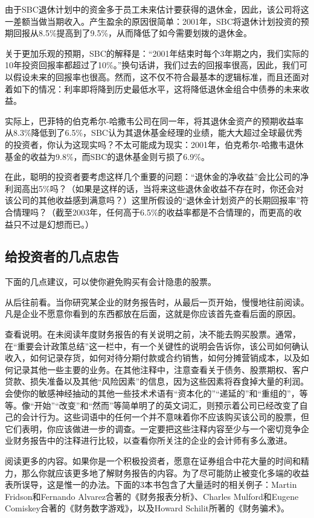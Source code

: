 \documentclass[12pt,oneside]{book}
\begin{document}
由于SBC退休计划中的资金多于员工未来估计要获得的退休金，因此，该公司将这一差额当做当期收入。产生盈余的原因很简单：2001年，SBC将退休计划投资的预期回报从8.5\%提高到了9.5\%，从而降低了如今需要划拨的退休金。

关于更加乐观的预期，SBC的解释是：“2001年结束时每个3年期之内，我们实际的10年投资回报率都超过了10\%。”换句话讲，我们过去的回报率很高，因此，我们可以假设未来的回报率也很高。然而，这不仅不符合最基本的逻辑标准，而且还面对着如下的情况：利率即将降到历史最低水平，这将降低退休金组合中债券的未来收益。

实际上，巴菲特的伯克希尔-哈撒韦公司在同一年，将其退休金资产的预期收益率从8.3\%降低到了6.5\%，SBC认为其退休基金经理的业绩，能大大超过全球最优秀的投资者，你认为这现实吗？不太可能成为现实：2001年，伯克希尔-哈撒韦退休基金的收益为9.8\%，而SBC的退休基金则亏损了6.9\%。

在此，聪明的投资者要考虑这样几个重要的问题：“退休金的净收益”会比公司的净利润高出5\%吗？（如果是这样的话，当将来这些退休金收益不存在时，你还会对该公司的其他收益感到满意吗？）这里所假设的“退休金计划资产的长期回报率”符合情理吗？（截至2003年，任何高于6.5\%的收益率都是不合情理的，而更高的收益只不过是幻想而已。）

\subsection{给投资者的几点忠告}
下面的几点建议，可以使你避免购买有会计隐患的股票。

从后往前看。当你研究某企业的财务报告时，从最后一页开始，慢慢地往前阅读。凡是企业不愿意你看到的东西都放在后面，这就是你应该首先查看后面的原因。

查看说明。在未阅读年度财务报告的有关说明之前，决不能去购买股票。通常，在“重要会计政策总结”这一栏中，有一个关键性的说明会告诉你，该公司如何确认收入，如何记录存货，如何对待分期付款或合约销售，如何分摊营销成本，以及如何记录其他一些主要的业务。在其他注释中，注意查看关于债务、股票期权、客户贷款、损失准备以及其他“风险因素”的信息，因为这些因素将吞食掉大量的利润。会使你的敏感神经抽动的其他一些技术术语有“资本化的”“递延的”和“重组的”，等等。像“开始”“改变”和“然而”等简单明了的英文词汇，则预示着公司已经改变了自己的会计行为。这些词语中的任何一个并不意味着你不应该购买该公司的股票，但它们表明，你应该做进一步的调查。一定要把这些注释内容至少与一个密切竞争企业财务报告中的注释进行比较，以查看你所关注的企业的会计师有多么激进。

阅读更多的内容。如果你是一个积极投资者，愿意在证券组合中花大量的时间和精力，那么你就应该更多地了解财务报告的内容。为了尽可能防止被变化多端的收益表所误导，这是惟一的办法。下面的3本书包含了大量适时的相关例子：Martin Fridson和Fernando Alvarez合著的《财务报表分析》、Charles Mulford和Eugene Comiskey合著的《财务数字游戏》，以及Howard Schilit所著的《财务骗术》。
\end{document}
